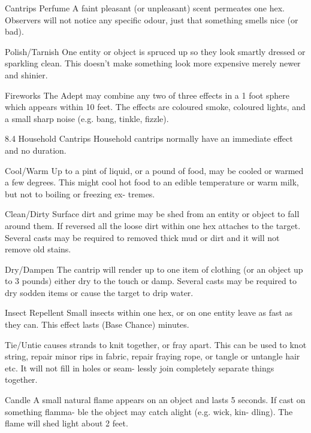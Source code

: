 \begin{Chapter}{Cantrips}
Perfume  A  faint  pleasant  (or  unpleasant)  scent 
permeates  one  hex.  Observers  will  not  notice  any 
specific  odour,  just  that  something  smells  nice  (or 
bad). 

Polish/Tarnish  One  entity  or  object is  spruced  up 
so  they  look  smartly  dressed  or  sparkling  clean. 
This doesn’t make something look more expensive 
merely newer and shinier. 

Fireworks  The  Adept  may  combine  any  two  of 
three  effects  in  a  1  foot  sphere  which  appears 
within  10  feet.  The  effects  are  coloured  smoke, 
coloured lights, and a small sharp noise (e.g. bang, 
tinkle, fizzle). 

8.4 Household Cantrips 
Household  cantrips  normally  have  an  immediate 
effect and no duration. 

Cool/Warm  Up  to  a  pint  of  liquid,  or  a  pound  of 
food,  may  be  cooled  or  warmed  a  few  degrees. 
This  might  cool  hot  food  to  an  edible  temperature 
or  warm  milk,  but  not  to  boiling  or  freezing  ex-
tremes. 

Clean/Dirty  Surface  dirt  and  grime  may  be  shed 
from  an  entity  or  object  to  fall  around  them.  If 
reversed  all  the  loose  dirt  within  one  hex  attaches 
to  the  target.  Several  casts  may  be  required  to 
removed  thick  mud  or  dirt  and  it  will  not  remove 
old stains. 

Dry/Dampen  The  cantrip  will  render  up  to  one 
item  of  clothing  (or  an  object  up  to  3  pounds) 
either dry to the touch or damp. Several casts may 
be required to dry sodden items or cause the target 
to drip water. 

Insect  Repellent  Small  insects  within  one  hex,  or 
on one entity leave as fast as they can. This effect 
lasts (Base Chance) minutes. 

Tie/Untie  causes  strands  to  knit  together,  or  fray 
apart. This can be used to knot string, repair minor 
rips  in  fabric,  repair  fraying  rope,  or  tangle  or 
untangle  hair  etc.  It  will  not  fill  in  holes  or  seam-
lessly join completely separate things together. 

Candle A small natural flame appears on an object 
and  lasts 5  seconds.  If  cast  on  something  flamma-
ble  the  object  may  catch  alight  (e.g.  wick,  kin-
dling). The flame will shed light about 2 feet. 

\end{Chapter}
